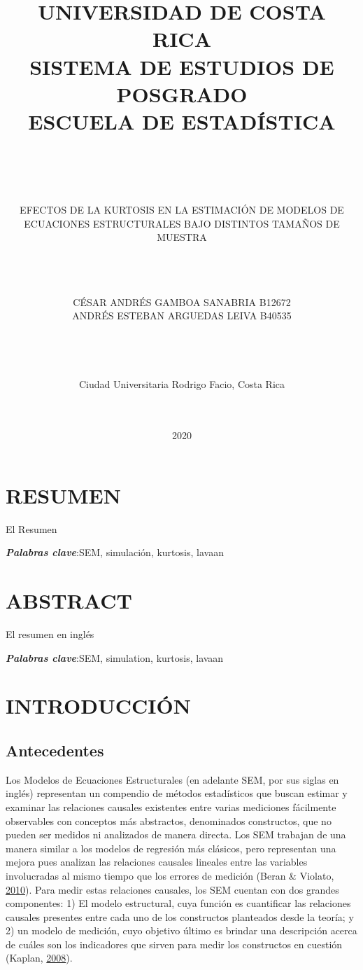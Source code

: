 \documentclass[
]{article}
\title{UNIVERSIDAD DE COSTA RICA\\
SISTEMA DE ESTUDIOS DE POSGRADO\\
ESCUELA DE ESTADÍSTICA\\
~\\
~\\}
\subtitle{EFECTOS DE LA KURTOSIS EN LA ESTIMACIÓN DE MODELOS DE ECUACIONES
ESTRUCTURALES BAJO DISTINTOS TAMAÑOS DE MUESTRA\\
~\\
~\\
~\\}
\author{CÉSAR ANDRÉS GAMBOA SANABRIA B12672\\
ANDRÉS ESTEBAN ARGUEDAS LEIVA B40535\\
~\\
~\\
~\\
~\\
Ciudad Universitaria Rodrigo Facio, Costa Rica\\
~\\
~\\}
\date{2020}
\begin{document}
\maketitle

\cleardoublepage

\newpage

\section*{RESUMEN}

El Resumen

\textbf{\emph{Palabras clave}}:SEM, simulación, kurtosis, lavaan
\cleardoublepage

\section*{ABSTRACT}

El resumen en inglés

\textbf{\emph{Palabras clave}}:SEM, simulation, kurtosis, lavaan
\cleardoublepage

\newpage

\tableofcontents
\cleardoublepage
{}

\newpage

\section{INTRODUCCIÓN}

\subsection{Antecedentes}

Los Modelos de Ecuaciones Estructurales (en adelante SEM, por sus siglas
en inglés) representan un compendio de métodos estadísticos que buscan
estimar y examinar las relaciones causales existentes entre varias
mediciones fácilmente observables con conceptos más abstractos,
denominados constructos, que no pueden ser medidos ni analizados de
manera directa. Los SEM trabajan de una manera similar a los modelos de
regresión más clásicos, pero representan una mejora pues analizan las
relaciones causales lineales entre las variables involucradas al mismo
tiempo que los errores de medición (Beran \& Violato,
\protect\hyperlink{ref-Beran2010StructuralEM}{2010}). Para medir estas
relaciones causales, los SEM cuentan con dos grandes componentes: 1) El
modelo estructural, cuya función es cuantificar las relaciones causales
presentes entre cada uno de los constructos planteados desde la teoría;
y 2) un modelo de medición, cuyo objetivo último es brindar una
descripción acerca de cuáles son los indicadores que sirven para medir
los constructos en cuestión (Kaplan,
\protect\hyperlink{ref-kaplan}{2008}).
\end{document}
